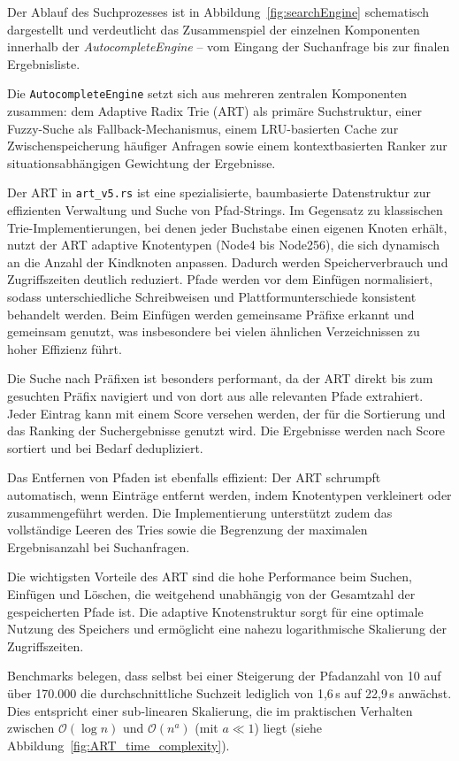 Der Ablauf des Suchprozesses ist in Abbildung~\ref{fig:searchEngine}
schematisch dargestellt und verdeutlicht das Zusammenspiel der einzelnen Komponenten
innerhalb der \textit{AutocompleteEngine} – vom Eingang der Suchanfrage bis zur finalen Ergebnisliste.

Die \verb|AutocompleteEngine| setzt sich aus mehreren zentralen Komponenten zusammen: dem Adaptive Radix Trie (ART) als primäre Suchstruktur, einer Fuzzy-Suche als Fallback-Mechanismus, einem LRU-basierten Cache zur Zwischenspeicherung häufiger Anfragen sowie einem kontextbasierten Ranker zur situationsabhängigen Gewichtung der Ergebnisse.

Der ART in \verb|art_v5.rs| ist eine spezialisierte, baumbasierte Datenstruktur zur effizienten Verwaltung und Suche von Pfad-Strings.
Im Gegensatz zu klassischen Trie-Implementierungen, bei denen jeder Buchstabe einen eigenen Knoten erhält, nutzt der ART adaptive Knotentypen (Node4 bis Node256),
die sich dynamisch an die Anzahl der Kindknoten anpassen.
Dadurch werden Speicherverbrauch und Zugriffszeiten deutlich reduziert.
Pfade werden vor dem Einfügen normalisiert, sodass unterschiedliche Schreibweisen und Plattformunterschiede konsistent behandelt werden.
Beim Einfügen werden gemeinsame Präfixe erkannt und gemeinsam genutzt,
was insbesondere bei vielen ähnlichen Verzeichnissen zu hoher Effizienz führt.

Die Suche nach Präfixen ist besonders performant, da der ART direkt bis zum gesuchten Präfix navigiert
und von dort aus alle relevanten Pfade extrahiert.
Jeder Eintrag kann mit einem Score versehen werden, der für die Sortierung und das Ranking der Suchergebnisse genutzt wird.
Die Ergebnisse werden nach Score sortiert und bei Bedarf dedupliziert.

Das Entfernen von Pfaden ist ebenfalls effizient:
Der ART schrumpft automatisch, wenn Einträge entfernt werden, indem Knotentypen verkleinert oder zusammengeführt werden.
Die Implementierung unterstützt zudem das vollständige Leeren des Tries
sowie die Begrenzung der maximalen Ergebnisanzahl bei Suchanfragen.

Die wichtigsten Vorteile des ART sind die hohe Performance beim Suchen, Einfügen und Löschen,
die weitgehend unabhängig von der Gesamtzahl der gespeicherten Pfade ist.
Die adaptive Knotenstruktur sorgt für eine optimale Nutzung des Speichers
und ermöglicht eine nahezu logarithmische Skalierung der Zugriffszeiten.

Benchmarks belegen, dass selbst bei einer Steigerung der Pfadanzahl von 10 auf über 170.000
die durchschnittliche Suchzeit lediglich von 1{,}6\,\textmu s auf 22{,}9\,\textmu s anwächst.
Dies entspricht einer sub-linearen Skalierung,
die im praktischen Verhalten zwischen $\mathcal{O}(\log n)$ und $\mathcal{O}(n^a)$ (mit $a \ll 1$) liegt (siehe Abbildung~\ref{fig:ART_time_complexity}).

